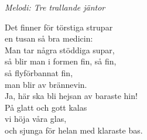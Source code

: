 {\footnotesize\textit{Melodi: Tre trallande jäntor}}\par
\vspace{10pt}
Det finner för törstiga strupar\\
en tusan så bra medicin:\\
Man tar några stöddiga supar,\\
så blir man i formen fin, så fin,\\
så flyförbannat fin,\\
man blir av brännevin.\\
Ja, här ska bli hejsan av baraste hin!\\
På glatt och gott kalas\\
vi höja våra glas,\\
och sjunga för helan med klaraste bas.

